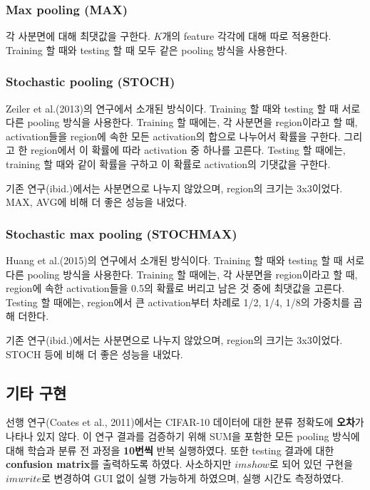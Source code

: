 \documentclass[a4paper,9pt,hidelinks]{article}
\begin{document}
\begin{multicols*}{2}
\subsubsection{Max pooling (MAX)}

각 사분면에 대해 최댓값을 구한다.
$K$개의 feature 각각에 대해 따로 적용한다.
Training 할 때와 testing 할 때 모두 같은 pooling 방식을 사용한다.

\subsubsection{Stochastic pooling (STOCH)}

Zeiler et al.(2013)의 연구에서 소개된 방식이다.
Training 할 때와 testing 할 때 서로 다른 pooling 방식을 사용한다.
Training 할 때에는, 각 사분면을 region이라고 할 때, activation들을 region에 속한 모든 activation의 합으로 나누어서 확률을 구한다.
그리고 한 region에서 이 확률에 따라 activation 중 하나를 고른다.
Testing 할 때에는, training 할 때와 같이 확률을 구하고 이 확률로 activation의 기댓값을 구한다.

기존 연구(ibid.)에서는 사분면으로 나누지 않았으며, region의 크기는 3x3이었다. MAX, AVG에 비해 더 좋은 성능을 내었다.

\subsubsection{Stochastic max pooling (STOCHMAX)}

Huang et al.(2015)의 연구에서 소개된 방식이다.
Training 할 때와 testing 할 때 서로 다른 pooling 방식을 사용한다.
Training 할 때에는, 각 사분면을 region이라고 할 때, region에 속한 activation들을 0.5의 확률로 버리고 남은 것 중에 최댓값을 고른다.
Testing 할 때에는, region에서 큰 activation부터 차례로 1/2, 1/4, 1/8의 가중치를 곱해 더한다.

기존 연구(ibid.)에서는 사분면으로 나누지 않았으며, region의 크기는 3x3이었다. STOCH 등에 비해 더 좋은 성능을 내었다.

\subsection{기타 구현}

선행 연구(Coates et al., 2011)에서는 CIFAR-10 데이터에 대한 분류 정확도에 \textbf{오차}가 나타나 있지 않다.
이 연구 결과를 검증하기 위해 SUM을 포함한 모든 pooling 방식에 대해 학습과 분류 전 과정을 \textbf{10번씩} 반복 실행하였다.
또한 testing 결과에 대한 \textbf{confusion matrix}를 출력하도록 하였다.
사소하지만 $imshow$로 되어 있던 구현을 $imwrite$로 변경하여 GUI 없이 실행 가능하게 하였으며, 실행 시간도 측정하였다.


\end{multicols*}
\end{document}
